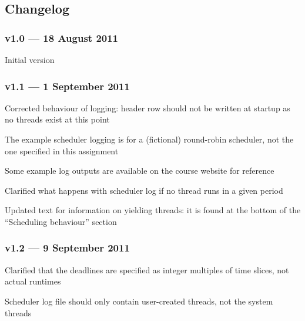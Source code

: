 \documentclass[12pt,a4paper]{article}
\begin{document}
\subsection*{Changelog}

\subsubsection*{v1.0 --- 18 August 2011}
\begin{compactenum}
    \item Initial version
\end{compactenum}

\subsubsection*{\color{red}v1.1 --- 1 September 2011}
\begin{compactenum}
    \item Corrected behaviour of logging: header row should not be written at startup as no threads exist at this point
    \item The example scheduler logging is for a (fictional) round-robin scheduler, not the one specified in this assignment
    \item Some example log outputs are available on the course website for reference
    \item Clarified what happens with scheduler log if no thread runs in a given period
    \item Updated text for information on yielding threads: it is found at the bottom of the ``Scheduling behaviour'' section
\end{compactenum}

\subsubsection*{\color{blue}v1.2 --- 9 September 2011}
\begin{compactenum}
    \item Clarified that the deadlines are specified as integer multiples of time slices, not actual runtimes
    \item Scheduler log file should only contain user-created threads, not the system threads
\end{compactenum}
\end{document}
